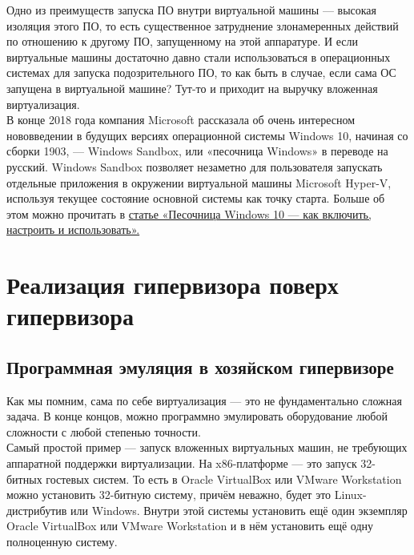 \documentclass[14pt, a4paper]{article}
\begin{document}
Одно из преимуществ запуска ПО внутри виртуальной машины — высокая изоляция этого ПО, то есть
существенное затруднение злонамеренных действий по отношению к другому ПО, запущенному на
этой аппаратуре. И если виртуальные машины достаточно давно стали использоваться в
операционных системах для запуска подозрительного ПО, то как быть в случае, если сама ОС
запущена в виртуальной машине? Тут-то и приходит на выручку вложенная виртуализация.\\

В конце 2018 года компания Microsoft рассказала об очень интересном нововведении в будущих
версиях операционной системы Windows 10, начиная со сборки 1903, — Windows Sandbox, или 
«песочница Windows» в переводе на русский. Windows Sandbox позволяет незаметно для
пользователя запускать отдельные приложения в окружении виртуальной машины Microsoft Hyper-V,
используя текущее состояние основной системы как точку старта. Больше об этом можно прочитать в
\href{https://remontka.pro/sandbox-windows-10/}{статье «Песочница Windows 10 — как включить, настроить и использовать».}

\section*{Реализация гипервизора поверх гипервизора}

\subsection*{Программная эмуляция в хозяйском гипервизоре}

Как мы помним, сама по себе виртуализация — это не фундаментально сложная задача. В конце
концов, можно программно эмулировать оборудование любой сложности с любой степенью точности.\\

Самый простой пример — запуск вложенных виртуальных машин, не требующих аппаратной
поддержки виртуализации. На x86-платформе — это запуск 32-битных гостевых систем. То есть в
Oracle VirtualBox или VMware Workstation можно установить 32-битную систему, причём неважно,
будет это Linux-дистрибутив или Windows. Внутри этой системы установить ещё один экземпляр
Oracle VirtualBox или VMware Workstation и в нём установить ещё одну полноценную систему.\\
\end{document}
